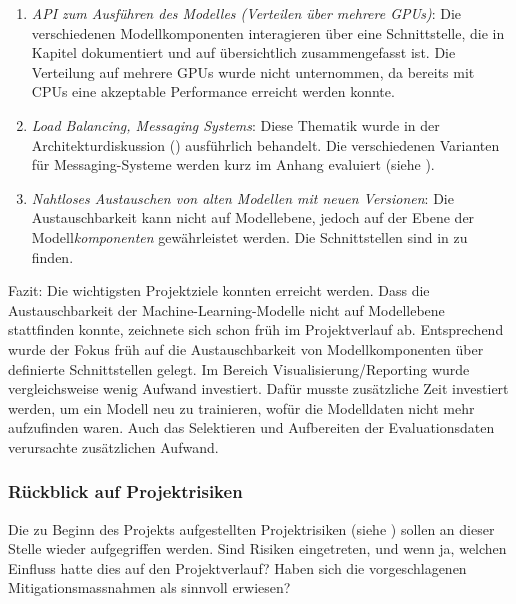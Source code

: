 \begin{enumerate}
\begin{enumerate}
        \item \textit{API zum Ausführen des Modelles (Verteilen über mehrere GPUs)}: Die verschiedenen Modellkomponenten interagieren über eine Schnittstelle, die in Kapitel  dokumentiert und auf  übersichtlich zusammengefasst ist. Die Verteilung auf mehrere GPUs wurde nicht unternommen, da bereits mit CPUs eine akzeptable Performance erreicht werden konnte.
        \item \textit{Load Balancing, Messaging Systems}: Diese Thematik wurde in der Architekturdiskussion () ausführlich behandelt. Die verschiedenen Varianten für Messaging-Systeme werden kurz im Anhang evaluiert (siehe ).
        \item \textit{Nahtloses Austauschen von alten Modellen mit neuen Versionen}: Die Austauschbarkeit kann nicht auf Modellebene, jedoch auf der Ebene der Modell\textit{komponenten} gewährleistet werden. Die Schnittstellen sind in  zu finden.
    \end{enumerate}
\end{enumerate}

Fazit: Die wichtigsten Projektziele konnten erreicht werden. Dass die Austauschbarkeit der Machine-Learning-Modelle nicht auf Modellebene stattfinden konnte, zeichnete sich schon früh im Projektverlauf ab. Entsprechend wurde der Fokus früh auf die Austauschbarkeit von Modellkomponenten über definierte Schnittstellen gelegt. Im Bereich Visualisierung/Reporting wurde vergleichsweise wenig Aufwand investiert. Dafür musste zusätzliche Zeit investiert werden, um ein Modell neu zu trainieren, wofür die Modelldaten nicht mehr aufzufinden waren. Auch das Selektieren und Aufbereiten der Evaluationsdaten verursachte zusätzlichen Aufwand.

\subsubsection{Rückblick auf Projektrisiken}

Die zu Beginn des Projekts aufgestellten Projektrisiken (siehe ) sollen an dieser Stelle wieder aufgegriffen werden. Sind Risiken eingetreten, und wenn ja, welchen Einfluss hatte dies auf den Projektverlauf? Haben sich die vorgeschlagenen Mitigationsmassnahmen als sinnvoll erwiesen?

